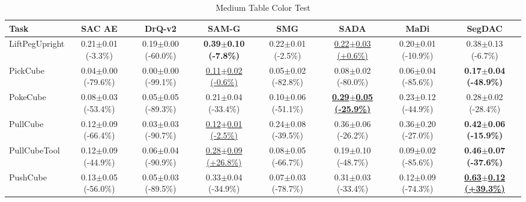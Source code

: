 \begin{table}[htbp]
\centering
\scriptsize
\caption{Medium Table Color Test}
\label{tab:appendix_tablecolortest_medium}
\begin{adjustbox}{max width=\textwidth}
\begin{tabular}{l*{7}{c}}
\toprule
\textbf{Task} & \textbf{SAC AE} & \textbf{DrQ-v2} & \textbf{SAM-G} & \textbf{SMG} & \textbf{SADA} & \textbf{MaDi} & \textbf{SegDAC} \\
\midrule
LiftPegUpright & 0.21$\pm$0.01 \scriptsize{(-3.3\%)} & 0.19$\pm$0.00 \scriptsize{(-60.0\%)} & \textbf{0.39$\pm$0.10 \scriptsize{(-7.8\%)}} & 0.22$\pm$0.01 \scriptsize{(-2.5\%)} & \underline{0.22$\pm$0.03 \scriptsize{(+0.6\%)}} & 0.20$\pm$0.01 \scriptsize{(-10.9\%)} & 0.38$\pm$0.13 \scriptsize{(-6.7\%)} \\
PickCube & 0.04$\pm$0.00 \scriptsize{(-79.6\%)} & 0.00$\pm$0.00 \scriptsize{(-99.1\%)} & \underline{0.11$\pm$0.02 \scriptsize{(-0.6\%)}} & 0.05$\pm$0.02 \scriptsize{(-82.8\%)} & 0.08$\pm$0.02 \scriptsize{(-80.0\%)} & 0.06$\pm$0.04 \scriptsize{(-85.6\%)} & \textbf{0.17$\pm$0.04 \scriptsize{(-48.9\%)}} \\
PokeCube & 0.08$\pm$0.03 \scriptsize{(-53.4\%)} & 0.05$\pm$0.05 \scriptsize{(-89.3\%)} & 0.21$\pm$0.04 \scriptsize{(-33.4\%)} & 0.10$\pm$0.06 \scriptsize{(-51.1\%)} & \textbf{\underline{0.29$\pm$0.05 \scriptsize{(-25.9\%)}}} & 0.23$\pm$0.12 \scriptsize{(-44.9\%)} & 0.28$\pm$0.02 \scriptsize{(-28.4\%)} \\
PullCube & 0.12$\pm$0.09 \scriptsize{(-66.4\%)} & 0.03$\pm$0.03 \scriptsize{(-90.7\%)} & \underline{0.12$\pm$0.01 \scriptsize{(-2.5\%)}} & 0.24$\pm$0.08 \scriptsize{(-39.5\%)} & 0.36$\pm$0.06 \scriptsize{(-26.2\%)} & 0.36$\pm$0.20 \scriptsize{(-27.0\%)} & \textbf{0.42$\pm$0.06 \scriptsize{(-15.9\%)}} \\
PullCubeTool & 0.12$\pm$0.09 \scriptsize{(-44.9\%)} & 0.06$\pm$0.04 \scriptsize{(-90.9\%)} & \underline{0.28$\pm$0.09 \scriptsize{(+26.8\%)}} & 0.08$\pm$0.05 \scriptsize{(-66.7\%)} & 0.19$\pm$0.10 \scriptsize{(-48.7\%)} & 0.09$\pm$0.02 \scriptsize{(-85.6\%)} & \textbf{0.46$\pm$0.07 \scriptsize{(-37.6\%)}} \\
PushCube & 0.13$\pm$0.05 \scriptsize{(-56.0\%)} & 0.05$\pm$0.03 \scriptsize{(-89.5\%)} & 0.33$\pm$0.04 \scriptsize{(-34.9\%)} & 0.07$\pm$0.03 \scriptsize{(-78.7\%)} & 0.31$\pm$0.03 \scriptsize{(-33.4\%)} & 0.12$\pm$0.09 \scriptsize{(-74.3\%)} & \textbf{\underline{0.63$\pm$0.12 \scriptsize{(+39.3\%)}}} \\

\end{tabular}
\end{adjustbox}
\end{table}
